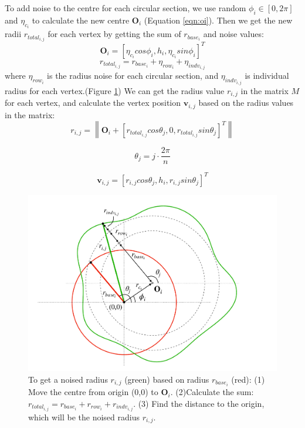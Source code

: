 \documentclass{svjour3}                     %
\begin{document}
To add noise to the centre for each circular section, we use random $\phi_{i} \in [0, 2\pi]$ and $\eta_{c_{i}}$ to calculate the new centre $\mathbf{O}_{i}$ (Equation \ref{eqn:oi}). Then we get the new radii $r_{total_{i,j}}$ for each vertex by getting the sum of $r_{base_{i}}$ and noise values:
\begin{equation}
\label{eqn:oi}
\mathbf{O}_{i} = \left[\eta_{c_{i}}cos\phi_{i}, h_{i}, \eta_{c_{i}}sin\phi_{i}\right]^T
\end{equation}
\begin{equation}
r_{total_{i,j}} = r_{base_{i}} + \eta_{row_{i}} + \eta_{indv_{i,j}}
\end{equation}
where $\eta_{row_{i}}$ is the radius noise for each circular section, and $\eta_{indv_{i,j}}$ is individual radius for each vertex.(Figure \ref{fig:noise}) We can get the radius value $r_{i,j}$ in the matrix $M$ for each vertex, and calculate the vertex position $\mathbf{v}_{i,j}$ based on the radius values in the matrix:
\begin{equation}
r_{i,j} = \left\|
\mathbf{O}_{i} + \left[ r_{total_{i,j}} cos \theta_{j},
0,
r_{total_{i,j}} sin \theta_{j}
\right]^T
\right\| 
\end{equation}

\begin{equation}
\theta_{j} = j \cdot \frac{2\pi}{n}
\end{equation}

\begin{equation}
\label{eqn:v}
\mathbf{v}_{i,j} =
\left[r_{i,j}  cos \theta_{j},
h_{i},
r_{i,j} sin \theta_{j}\right]^T
\end{equation}

\begin{figure}
\includegraphics[width=\textwidth]{fig4.pdf}
\caption{To get a noised radius $r_{i,j}$ (green) based on radius $r_{base_{i}}$ (red): (1) Move the centre from origin (0,0) to $\mathbf{O}_{i}$. (2)Calculate the sum: $r_{total_{i,j}} = r_{base_{i}} + r_{row_{i}} + r_{indv_{i,j}}$. (3) Find the distance to the origin, which will be the noised radius $r_{i,j}$.}
\label{fig:noise}
\end{figure}
\end{document}
